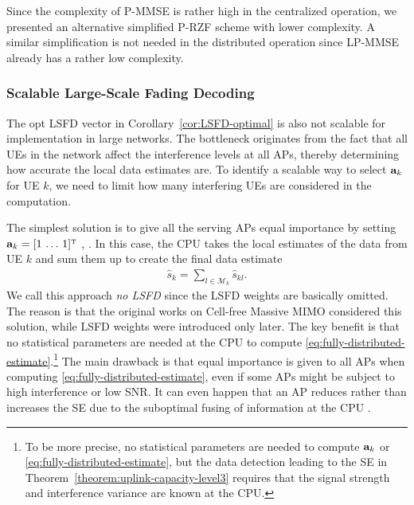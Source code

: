\begin{remark}
Since the complexity of P-MMSE is rather high in the centralized operation, we presented an alternative simplified P-RZF scheme with lower complexity. A similar simplification is not needed in the distributed operation since LP-MMSE already has a rather low complexity.
\end{remark}



\subsubsection{Scalable Large-Scale Fading Decoding}

The opt LSFD vector in Corollary~\ref{cor:LSFD-optimal} is also not scalable for implementation in large networks. The bottleneck originates from the fact that all UEs in the network affect the interference levels at all APs, thereby determining how accurate the local data estimates are.
To identify a scalable way to select ${\mathbf{a}}_{k}$ for UE $k$, we need to limit how many interfering UEs are considered in the computation.

The simplest solution is to give all the serving APs equal importance by setting ${\vect{a}}_{k} = [1 \, \ldots \, 1]^{\Ttran}$ \cite{Nayebi2017a}, \cite{Ngo2017b}. In this case, the CPU takes the local estimates of the data from UE $k$ and sum them up to create the final data estimate
\begin{align}\label{eq:fully-distributed-estimate}
\widehat s_{k} = \sum_{l\in\mathcal{M}_k} \widehat s_{kl}.
\end{align}
We call this approach \emph{no LSFD} since the LSFD weights are basically omitted. The reason is that the original works on Cell-free Massive MIMO considered this solution, while  LSFD weights were introduced only later. The key benefit is that no statistical parameters are needed at the CPU to compute \eqref{eq:fully-distributed-estimate}.\footnote{To be more precise, no statistical parameters are needed to compute ${\mathbf{a}}_{k}$ or \eqref{eq:fully-distributed-estimate}, but the data detection leading to the SE in Theorem~\ref{theorem:uplink-capacity-level3} requires that the signal strength and interference variance are known at the CPU.} The main drawback is that equal importance is given to all APs when computing \eqref{eq:fully-distributed-estimate}, even if some APs might be subject to high interference or low SNR. It can even happen that an AP reduces rather than increases the SE due to the suboptimal fusing of information at the CPU \cite{Buzzi2017b}.

